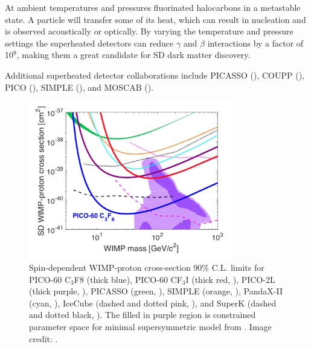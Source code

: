 At ambient temperatures and pressures fluorinated halocarbons in a metastable state.  A particle will transfer some of its heat,
which can result in nucleation and is observed acoustically or optically.  By varying the temperature and pressure settings
the superheated detectors can reduce $\gamma$ and $\beta$ interactions by a factor of 10$^{9}$, making them a great candidate for
SD dark matter discovery.

Additional superheated detector collaborations include PICASSO (), COUPP (),
PICO (), SIMPLE (), and MOSCAB ().


\begin{figure}
 \centering
 \includegraphics[width=0.8\textwidth]{spin_dependent_limits}
 \caption{Spin-dependent WIMP-proton cross-section 90\% C.L. limits for PICO-60 C$_{3}$F${8}$ (thick blue), PICO-60 CF$_{3}$I (thick red,
 ), PICO-2L (thick purple, ), PICASSO (green, ), SIMPLE (orange,
 ), PandaX-II (cyan, ), IceCube (dashed and dotted pink, ), and SuperK (dashed and
 dotted black, ).  The filled in purple region is constrained parameter space for minimal
 supersymmetric model from .
 Image credit: .}
 \label{fig:sd_limits}
\end{figure}


